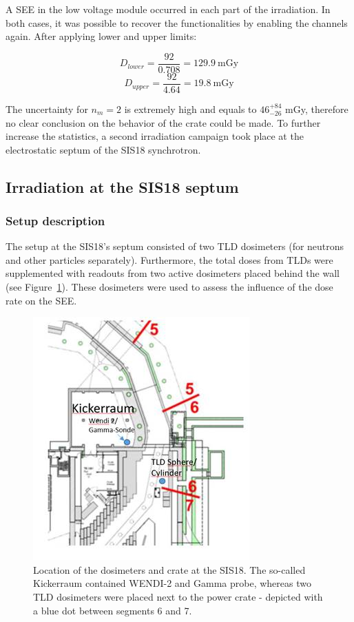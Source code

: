 A \gls{SEE} in the low voltage module occurred in each part of the irradiation. In both cases, it was possible to recover the functionalities by enabling the channels again. After applying lower and upper limits:

\begin{equation}
    D_{lower}=\frac{92}{0.708} = 129.9\mathrm{\ mGy}
\end{equation}
\begin{equation}
    D_{upper}=\frac{92}{4.64} = 19.8\mathrm{\ mGy}
\end{equation}

The uncertainty for $n_{m}=2$ is extremely high and equals to $\mathrm{46}_{-26}^{+84}$ mGy, therefore no clear conclusion on the behavior of the crate could be made. To further increase the statistics, a second irradiation campaign took place at the electrostatic septum of the SIS18 synchrotron. 

\subsection{Irradiation at the SIS18 septum}
\subsubsection{Setup description}
The setup at the SIS18's septum consisted of two \gls{TLD} dosimeters (for neutrons and other particles separately). Furthermore, the total doses from TLDs were supplemented with readouts from two active dosimeters placed behind the wall (see Figure~\ref{fig:spec_des}). These dosimeters were used to assess the influence of the dose rate on the \gls{SEE}.
\begin{figure}[!ht]
    \centering
    \includegraphics[width=0.45\columnwidth]{Chapter4/images/septum.jpg}
    \caption{Location of the dosimeters and crate at the SIS18. The so-called Kickerraum contained WENDI-2 and Gamma probe, whereas two TLD dosimeters were placed next to the power crate - depicted with a blue dot between segments 6 and 7.}
    \label{fig:spec_des}
\end{figure}

